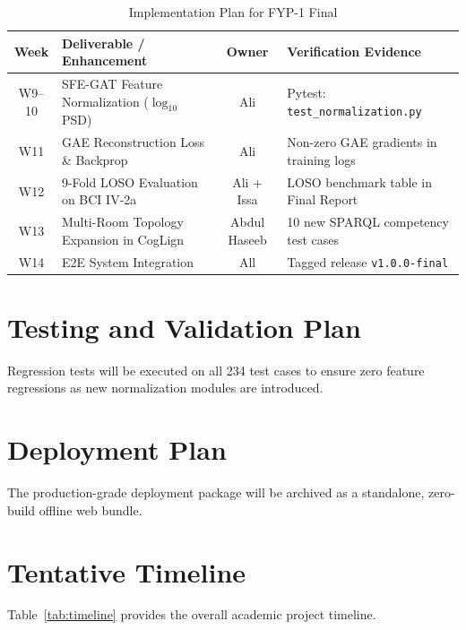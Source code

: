 \documentclass[12pt,a4paper]{report}
\begin{document}
\begin{table}[H]
\centering
\small
\caption{Implementation Plan for FYP-1 Final}
\label{tab:implementation_plan}
\begin{tabularx}{\textwidth}{c p{5.5cm} c X}
\toprule
\textbf{Week} & \textbf{Deliverable / Enhancement} & \textbf{Owner} & \textbf{Verification Evidence} \\
\midrule
W9--10 & SFE-GAT Feature Normalization ($\log_{10}$ PSD) & Ali & Pytest: \texttt{test\_normalization.py} \\
W11 & GAE Reconstruction Loss \& Backprop & Ali & Non-zero GAE gradients in training logs \\
W12 & 9-Fold LOSO Evaluation on BCI IV-2a & Ali + Issa & LOSO benchmark table in Final Report \\
W13 & Multi-Room Topology Expansion in CogLign & Abdul Haseeb & 10 new SPARQL competency test cases \\
W14 & E2E System Integration & All & Tagged release \texttt{v1.0.0-final} \\
\bottomrule
\end{tabularx}
\end{table}

\section{Testing and Validation Plan}
Regression tests will be executed on all 234 test cases to ensure zero feature regressions as new normalization modules are introduced.

\section{Deployment Plan}
The production-grade deployment package will be archived as a standalone, zero-build offline web bundle.

\section{Tentative Timeline}
Table~\ref{tab:timeline} provides the overall academic project timeline.
\end{document}
